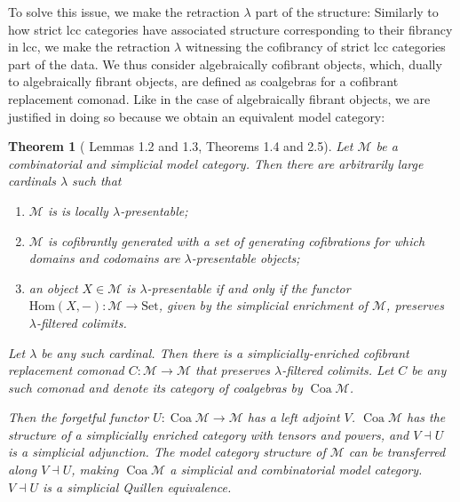 \documentclass{article}
\newtheorem{theorem}{Theorem}
\theoremstyle{remark}
\theoremstyle{definition}
\begin{document}
To solve this issue, we make the retraction $\lambda$ part of the structure:
Similarly to how strict lcc categories have associated structure corresponding to their fibrancy in lcc, we make the retraction $\lambda$ witnessing the cofibrancy of strict lcc categories part of the data.
We thus consider algebraically cofibrant objects, which, dually to algebraically fibrant objects, are defined as coalgebras for a cofibrant replacement comonad.
Like in the case of algebraically fibrant objects, we are justified in doing so because we obtain an equivalent model category:

\begin{theorem}[\cite{coalgebraic-models} Lemmas 1.2 and 1.3, Theorems 1.4 and 2.5]
  \label{th:coalgebraic-model-category}
  Let $\mathcal{M}$ be a combinatorial and simplicial model category.
  Then there are arbitrarily large cardinals $\lambda$ such that
  \begin{enumerate}
    \item
      $\mathcal{M}$ is is locally $\lambda$-presentable;
    \item
      $\mathcal{M}$ is cofibrantly generated with a set of generating cofibrations for which domains and codomains are $\lambda$-presentable objects;
    \item
      an object $X \in \mathcal{M}$ is $\lambda$-presentable if and only if the functor $\mathrm{Hom}(X, -) : \mathcal{M} \rightarrow \mathrm{Set}$, given by the simplicial enrichment of $\mathcal{M}$, preserves $\lambda$-filtered colimits.
  \end{enumerate}

  Let $\lambda$ be any such cardinal.
  Then there is a simplicially-enriched cofibrant replacement comonad $C : \mathcal{M} \rightarrow \mathcal{M}$ that preserves $\lambda$-filtered colimits. 
  Let $C$ be any such comonad and denote its category of coalgebras by $\operatorname{Coa} \mathcal{M}$.

  Then the forgetful functor $U : \operatorname{Coa} \mathcal{M} \rightarrow \mathcal{M}$ has a left adjoint $V$.
  $\operatorname{Coa} \mathcal{M}$ has the structure of a simplicially enriched category with tensors and powers, and $V \dashv U$ is a simplicial adjunction.
  The model category structure of $\mathcal{M}$ can be transferred along $V \dashv U$, making $\operatorname{Coa} \mathcal{M}$ a simplicial and combinatorial model category.
  $V \dashv U$ is a simplicial Quillen equivalence.
\end{theorem}
\end{document}
